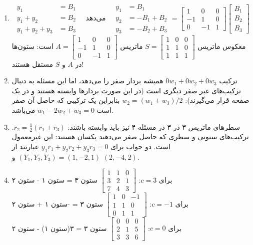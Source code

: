 \documentclass[12pt,a4paper]{article}
\begin{document}
{\begin{enumerate}
			\item
			\[
			\begin{aligned}
				y_1 &= B_1 \\
				y_1+y_2 &= B_2 \\
				y_1+y_2+y_3 &= B_3
			\end{aligned}
			\quad \text{می‌دهد} \quad
			\begin{aligned}
				y_1 &= B_1 \\
				y_2 &= -B_1+B_2 \\
				y_3 &= -B_2+B_3
			\end{aligned}
			=
			\begin{bmatrix} 1 & 0 & 0 \\ -1 & 1 & 0 \\ 0 & -1 & 1 \end{bmatrix}
			\begin{bmatrix} B_1 \\ B_2 \\ B_3 \end{bmatrix}
			\]
			معکوس ماتریس $S = \begin{bmatrix} 1 & 0 & 0 \\ 1 & 1 & 0 \\ 1 & 1 & 1 \end{bmatrix}$ ماتریس $A = \begin{bmatrix} 1 & 0 & 0 \\ -1 & 1 & 0 \\ 0 & -1 & 1 \end{bmatrix}$ است: ستون‌ها در $A$ و $S$ مستقل هستند!
			
			\item ترکیب $0w_1+0w_2+0w_3$ همیشه بردار صفر را می‌دهد، اما این مسئله به دنبال ترکیب‌های غیر صفر دیگری است (در این صورت بردارها وابسته هستند و در یک صفحه قرار می‌گیرند): $w_2=(w_1+w_3)/2$ بنابراین یک ترکیبی که حاصل آن صفر است $w_1-2w_2+w_3=0$ می‌باشد.
			
			\item سطرهای ماتریس ۳ در ۳ در مسئله ۴ نیز باید وابسته باشند: $r_2 = \frac{1}{2}(r_1+r_3)$. ترکیب‌های ستونی و سطری که حاصل صفر می‌دهند یکسان هستند: این غیرمعمول است. دو جواب برای $y_1r_1+y_2r_2+y_3r_3=0$ عبارتند از $(Y_1,Y_2,Y_3)=(1,-2,1)$ و $(2,-4,2)$.
			
			\item 
			برای $c=3$: $\begin{bmatrix} 1 & 1 & 0 \\ 3 & 2 & 1 \\ 7 & 4 & 3 \end{bmatrix}$ ستون ۳ = ستون ۱ - ستون ۲ \\
			برای $c=-1$: $\begin{bmatrix} 1 & 0 & -1 \\ 1 & 1 & 0 \\ 0 & 1 & 1 \end{bmatrix}$ ستون ۳ = -ستون ۱ + ستون ۲ \\
			برای $c=0$: $\begin{bmatrix} 0 & 0 & 0 \\ 2 & 1 & 5 \\ 3 & 3 & 6 \end{bmatrix}$ ستون ۳ = ۳(ستون ۱) - ستون ۲
		\end{enumerate}
		
}
\end{document}
